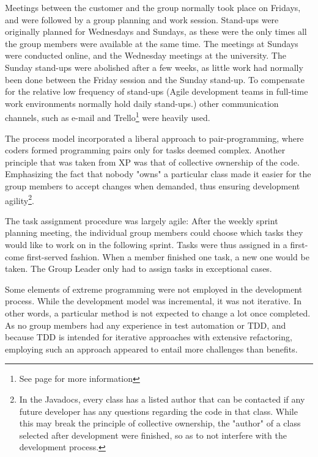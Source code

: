 Meetings between the customer and the group normally took place on Fridays, and were followed by a group planning and work session. Stand-ups were originally planned for Wednesdays and Sundays, as these were the only times all the group members were available at the same time. The meetings at Sundays were conducted online, and the Wednesday meetings at the university. The Sunday stand-ups were abolished after a few weeks, as little work had normally been done between the Friday session and the Sunday stand-up. To compensate for the relative low frequency of stand-ups (Agile development teams in full-time work environments normally hold daily stand-ups.) other communication channels, such as e-mail and Trello\footnote{See page \pageref{def:trello} for more information} were heavily used.

The process model incorporated a liberal approach to pair-programming, where coders formed programming pairs only for tasks deemed complex. Another principle that was taken from XP was that of collective ownership of the code. Emphasizing the fact that nobody "owns" a particular class made it easier for the group members to accept changes when demanded, thus ensuring development agility\footnote{In the Javadocs, every class has a listed author that can be contacted if any future developer has any questions regarding the code in that class. While this may break the principle of collective ownership, the "author" of a class selected after development were finished, so as to not interfere with the development process.}.

The task assignment procedure was largely agile: After the weekly sprint planning meeting, the individual group members could choose which tasks they would like to work on in the following sprint. Tasks were thus assigned in a first-come first-served fashion. When a member finished one task, a new one would be taken. The Group Leader only had to assign tasks in exceptional cases.

Some elements of extreme programming were not employed in the development process. While the development model was incremental, it was not iterative. In other words, a particular method is not expected to change a lot once completed. As no group members had any experience in test automation or TDD, and because TDD is intended for iterative approaches with extensive refactoring, employing such an approach appeared to entail more challenges than benefits.

